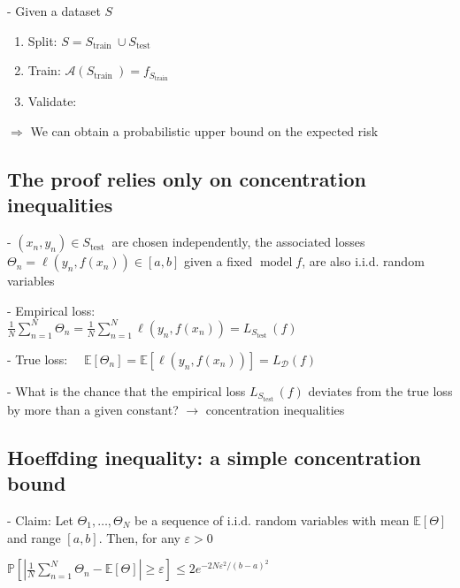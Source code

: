 - Given a dataset $S$

\begin{enumerate}
  \item Split: $S=S_{\text {train }} \cup S_{\text {test }}$

  \item Train: $\mathscr{A}\left(S_{\text {train }}\right)=f_{S_{\text {train }}}$

  \item Validate: 

\end{enumerate}


$\Rightarrow$ We can obtain a probabilistic upper bound on the expected risk

\subsection*{The proof relies only on concentration inequalities}
- $\left(x_{n}, y_{n}\right) \in S_{\text {test }}$ are chosen independently, the associated losses $\Theta_{n}=\ell\left(y_{n}, f\left(x_{n}\right)\right) \in[a, b]$ given a fixed $\operatorname{model} f$, are also i.i.d. random variables

- Empirical loss: \\$\frac{1}{N} \sum_{n=1}^{N} \Theta_{n}=\frac{1}{N} \sum_{n=1}^{N} \ell\left(y_{n}, f\left(x_{n}\right)\right)=L_{S_{\text {test }}}(f)$

- True loss: $\quad \mathbb{E}\left[\Theta_{n}\right]=\mathbb{E}\left[\ell\left(y_{n}, f\left(x_{n}\right)\right)\right]=L_{\mathscr{D}}(f)$

- What is the chance that the empirical loss $L_{S_{\text {test }}}(f)$ deviates from the true loss by more than a given constant? $\rightarrow$ concentration inequalities

\subsection*{Hoeffding inequality: a simple concentration bound}
- Claim: Let $\Theta_{1}, \ldots, \Theta_{N}$ be a sequence of i.i.d. random variables with mean $\mathbb{E}[\Theta]$ and range $[a, b]$. Then, for any $\varepsilon>0$

$
\mathbb{P}\left[\left|\frac{1}{N} \sum_{n=1}^{N} \Theta_{n}-\mathbb{E}[\Theta]\right| \geq \varepsilon\right] \leq 2 e^{-2 N \varepsilon^{2} /(b-a)^{2}}
$

